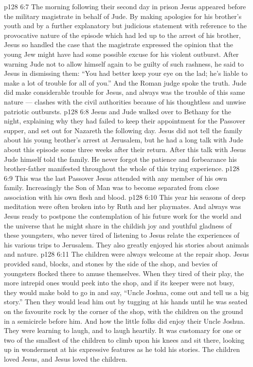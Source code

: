 \vs p128 6:7 The morning following their second day in prison Jesus appeared before the military magistrate in behalf of Jude. By making apologies for his brother’s youth and by a further explanatory but judicious statement with reference to the provocative nature of the episode which had led up to the arrest of his brother, Jesus so handled the case that the magistrate expressed the opinion that the young Jew might have had some possible excuse for his violent outburst. After warning Jude not to allow himself again to be guilty of such rashness, he said to Jesus in dismissing them: “You had better keep your eye on the lad; he’s liable to make a lot of trouble for all of you.” And the Roman judge spoke the truth. Jude did make considerable trouble for Jesus, and always was the trouble of this same nature --- clashes with the civil authorities because of his thoughtless and unwise patriotic outbursts.
\vs p128 6:8 Jesus and Jude walked over to Bethany for the night, explaining why they had failed to keep their appointment for the Passover supper, and set out for Nazareth the following day. Jesus did not tell the family about his young brother’s arrest at Jerusalem, but he had a long talk with Jude about this episode some three weeks after their return. After this talk with Jesus Jude himself told the family. He never forgot the patience and forbearance his brother\hyp{}father manifested throughout the whole of this trying experience.
\vs p128 6:9 This was the last Passover Jesus attended with any member of his own family. Increasingly the Son of Man was to become separated from close association with his own flesh and blood.
\vs p128 6:10 \pc This year his seasons of deep meditation were often broken into by Ruth and her playmates. And always was Jesus ready to postpone the contemplation of his future work for the world and the universe that he might share in the childish joy and youthful gladness of these youngsters, who never tired of listening to Jesus relate the experiences of his various trips to Jerusalem. They also greatly enjoyed his stories about animals and nature.
\vs p128 6:11 The children were always welcome at the repair shop. Jesus provided sand, blocks, and stones by the side of the shop, and bevies of youngsters flocked there to amuse themselves. When they tired of their play, the more intrepid ones would peek into the shop, and if its keeper were not busy, they would make bold to go in and say, “Uncle Joshua, come out and tell us a big story.” Then they would lead him out by tugging at his hands until he was seated on the favourite rock by the corner of the shop, with the children on the ground in a semicircle before him. And how the little folks did enjoy their Uncle Joshua. They were learning to laugh, and to laugh heartily. It was customary for one or two of the smallest of the children to climb upon his knees and sit there, looking up in wonderment at his expressive features as he told his stories. The children loved Jesus, and Jesus loved the children.
